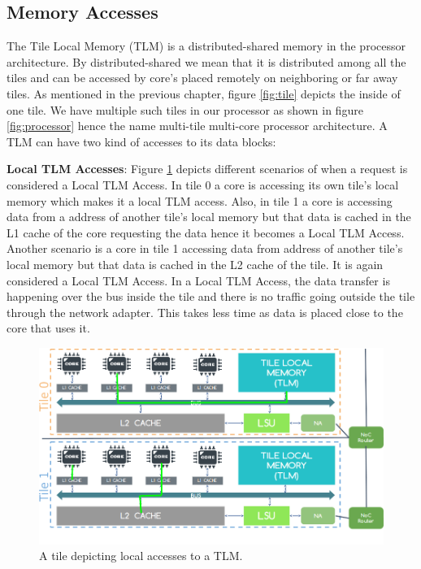 \documentclass{listhesis}
\begin{document}
\subsection{Memory Accesses}
The Tile Local Memory (TLM) is a distributed-shared memory in the processor architecture. By distributed-shared we mean that it is distributed among all the tiles and can be accessed by core's placed remotely on neighboring or far away tiles. As mentioned in the previous chapter, figure \ref{fig:tile} depicts the inside of one tile. We have multiple such tiles in our processor as shown in figure \ref{fig:processor} hence the name multi-tile multi-core processor architecture. A TLM can have two kind of accesses to its data blocks:\\
\par
\textbf{Local TLM Accesses}: Figure \ref{fig:localaccesses} depicts different scenarios of when a request is considered a Local TLM Access. In tile 0 a core is accessing its own tile's local memory which makes it a local TLM access. Also, in tile 1 a core is accessing data from a address of another tile's local memory but that data is cached in the L1 cache of the core requesting the data hence it becomes a Local TLM Access. Another scenario is a core in tile 1 accessing data from address of another tile's local memory but that data is cached in the L2 cache of the tile. It is again considered a Local TLM Access. In a Local TLM Access, the data transfer is happening over the bus inside the tile and there is no traffic going outside the tile through the network adapter. This takes less time as data is placed close to the core that uses it. \\
\begin{figure}
  \includegraphics[width=\linewidth]{localaccesses.png}
  \centering
  \caption{A tile depicting local accesses to a TLM.}
  \label{fig:localaccesses}
\end{figure}
\end{document}
